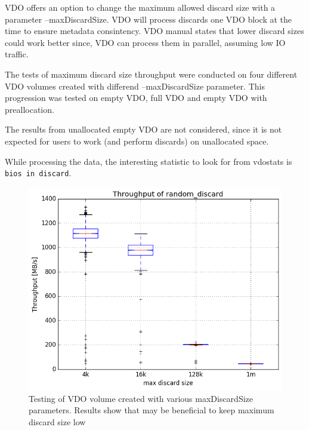 \documentclass[
  color, %
  table, %
  lof,   %
  lot,   %
]{fithesis3}
\begin{document}
VDO offers an option to change the maximum allowed discard size with a parameter --maxDiscardSize. VDO will process discards one VDO block at the time to ensure metadata consintency. VDO manual states that lower discard sizes could work better since, VDO can process them in parallel, assuming low IO traffic.

The tests of maximum discard size throughput were conducted on four different VDO volumes created with differend --maxDiscardSize parameter. This progression was tested on empty VDO, full VDO and empty VDO with preallocation.

The results from unallocated empty VDO are not considered, since it is not expected for users to work (and perform discards) on unallocated space.

While processing the data, the interesting statistic to look for from vdostats is \texttt{bios in discard}.





\begin{figure}[!htb]
        \centering
        \includegraphics[width=\textwidth]{../results/discards/empty_VDO/report/random_discard1_compare_boxplots}
\caption[Discards]{Testing of VDO volume created with various maxDiscardSize parameters. Results show that may be beneficial to keep maximum discard size low}
\label{fig:discard}
\end{figure}


\clearpage
\end{document}
